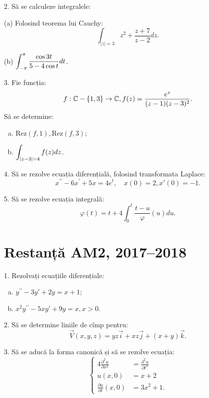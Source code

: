 2. Să se calculeze integralele:

(a) Folosind teorema lui Cauchy:
\[
  \int_{|z| = 3} z^2 + \frac{z + 7}{z - 2} dz.
\]

(b) $ \displaystyle\int_{-\pi}^\pi \frac{\cos 3t}{5 - 4\cos t} dt $.

\vspace{1cm}

3. Fie funcția:
\[
  f : \mathbb{C} - \{1, 3\} \to \mathbb{C}, f(z) = \frac{e^z}{(z - 1)(z - 3)^2}.
\]
Să se determine:
\begin{enumerate}[(a)]
\item $ \mathrm{Rez}(f, 1), \mathrm{Rez}(f, 3) $;
\item $ \displaystyle\int_{|z - 3| = 4} f(z) dz $.
\end{enumerate}

\vspace{1cm}

4. Să se rezolve ecuația diferențială, folosind transformata Laplace:
\[
  x^{\prime\prime} - 6x^\prime + 5x = 4e^t, \quad x(0) = 2, x'(0) = -1.
\]

\vspace{1cm}

5. Să se rezolve ecuația integrală:
\[
  \varphi(t) = t + 4 \int_0^t \frac{t - u}\varphi(u) du.
\]


\section{Restanță AM2, 2017--2018}

1. Rezolvați ecuațiile diferențiale:
\begin{enumerate}[(a)]
\item $ y^{\prime\prime} - 3y' + 2y = x + 1 $;
\item $ x^2 y^{\prime\prime} - 5xy' + 9y = x, x > 0 $.
\end{enumerate}

\vspace{1cm}

2. Să se determine liniile de cîmp pentru:
\[
  \vec{V}(x, y, z) = yz\vec{i} + xz\vec{j} + (x + y)\vec{k}.
\]

\vspace{1cm}

3. Să se aducă la forma canonică și să se rezolve ecuația:
\[
  \begin{cases}
    4 \frac{\partial^2 u}{\partial x^2} &= \frac{\partial^2 u}{\partial t^2} \\
    u(x, 0) &= x + 2 \\
    \frac{\partial u}{\partial t}(x, 0) &= 3x^2 + 1.
  \end{cases}
\]

